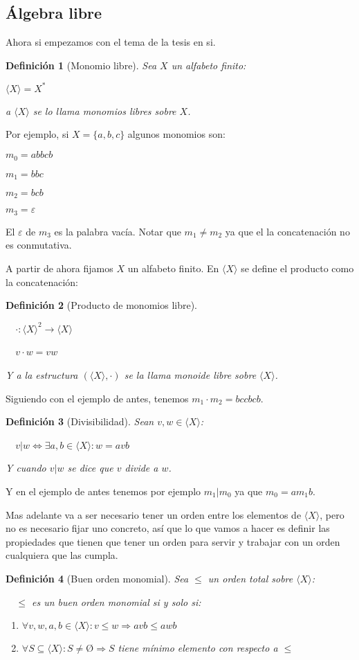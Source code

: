 \documentclass{amsbook}
\theoremstyle{customstyle}
\newtheorem{definition}{Definición}[section]
\begin{document}
\subsection{Álgebra libre}

Ahora si empezamos con el tema de la tesis en si.

\begin{definition}[Monomio libre]
Sea $X$ un alfabeto finito:

$⟨X⟩ = X^*$

a $⟨X⟩$ se lo llama monomios libres sobre $X$.
\end{definition}

Por ejemplo, si $X = \{a, b, c\}$ algunos monomios son:

$m_0 = abbcb$

$m_1 = bbc$

$m_2 = bcb$

$m_3 = ε$

El $ε$ de $m_3$ es la palabra vacía. Notar que $m_1 ≠ m_2$ ya que el la concatenación no es conmutativa.

A partir de ahora fijamos $X$ un alfabeto finito. En $⟨X⟩$ se define el producto como la concatenación:

\begin{definition}[Producto de monomios libre]\

  $· : ⟨X⟩^2 → ⟨X⟩$

  $v · w = vw$

Y a la estructura $(⟨X⟩, ·)$ se la llama monoide libre sobre $⟨X⟩$.
\end{definition}

Siguiendo con el ejemplo de antes, tenemos $m_1 · m_2 = bccbcb$.

\begin{definition}[Divisibilidad]
Sean $v, w ∈ ⟨X⟩$:

  $v | w ⇔ ∃a , b ∈ ⟨X⟩ : w = avb$

Y cuando $v | w$ se dice que $v$ divide a $w$.
\end{definition}

Y en el ejemplo de antes tenemos por ejemplo $m_1 | m_0$ ya que $m_0 = a m_1 b$.

Mas adelante va a ser necesario tener un orden entre los elementos de $⟨X⟩$, pero no es necesario fijar uno concreto, así que lo que vamos a hacer es definir las propiedades que tienen que tener un orden para servir y trabajar con un orden cualquiera que las cumpla.

\begin{definition}[Buen orden monomial]
Sea $≤$ un orden total sobre $⟨X⟩$:

  $≤$ es un buen orden monomial si y solo si:
\begin{enumerate}[label = (\alph*)]
\item $∀v, w, a, b ∈ ⟨X⟩ : v ≤ w ⇒ avb ≤ awb$

\item $∀S ⊆ ⟨X⟩ : S ≠ Ø ⇒ S$ tiene mínimo elemento con respecto a $≤$
\end{enumerate}
\end{definition}
\end{document}
